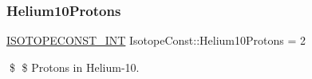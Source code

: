 \subsubsection{\texorpdfstring{Helium10\+Protons}{Helium10Protons}}
{\footnotesize\ttfamily \mbox{\hyperlink{group___isotope_const-_macros_ga5f18360b3e99483a35c32d789e62621c}{I\+S\+O\+T\+O\+P\+E\+C\+O\+N\+S\+T\+\_\+\+I\+NT}} Isotope\+Const\+::\+Helium10\+Protons = 2}

\$ \$ Protons in Helium-\/10. 